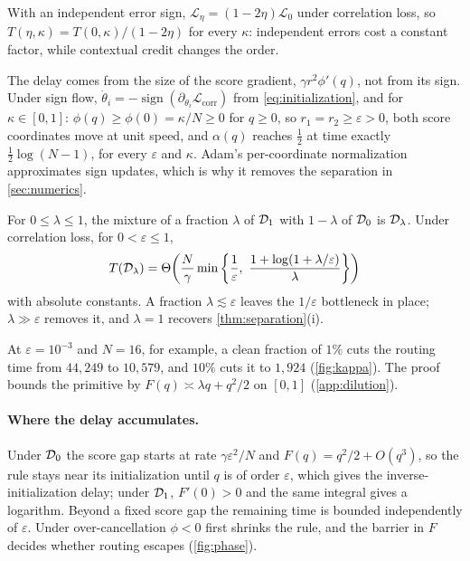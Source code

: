 \begin{remark}
\label{rem:rescaling}
With an independent error sign, $\mathcal L_\eta=(1-2\eta)\mathcal L_0$ under correlation loss, so $T(\eta,\kappa)=T(0,\kappa)/(1-2\eta)$ for every $\kappa$:
independent errors cost a constant factor, while contextual credit changes the order.
\end{remark}

\begin{remark}
\label{rem:sign-flow}
The delay comes from the size of the score gradient, $\gamma r^2\phi'(q)$, not from its sign. Under sign flow, $\dot\theta_i=-\operatorname{sign}(\partial_{\theta_i}\mathcal L_{\mathrm{corr}})$
from \cref{eq:initialization}, and for $\kappa\in[0,1]$: $\phi(q)\ge\phi(0)=\kappa/N\ge0$ for $q\ge0$, so $r_1=r_2\ge\varepsilon>0$, both score coordinates move at unit speed,
and $\alpha(q)$ reaches $\frac12$ at time exactly $\frac12\log(N-1)$, for every $\varepsilon$ and $\kappa$. Adam's per-coordinate normalization approximates sign updates,
which is why it removes the separation in \cref{sec:numerics}.
\end{remark}

\begin{corollary}
\label{cor:dilution}
For $0\le\lambda\le1$, the mixture of a fraction $\lambda$ of $\mathcal D_{1}$ with $1-\lambda$ of $\mathcal D_{0}$ is $\mathcal D_{\lambda}$.
Under correlation loss, for $0<\varepsilon\le1$,
\[
 \Tr(\Dlaw\lambda)=\Theta\!\left(\frac{N}{\gamma}\min\left\{\frac{1}{\varepsilon},\ \frac{1+\log(1+\lambda/\varepsilon)}{\lambda}\right\}\right)
\]
with absolute constants. A fraction $\lambda\lesssim\varepsilon$ leaves the $1/\varepsilon$ bottleneck in place; $\lambda\gg\varepsilon$ removes it,
and $\lambda=1$ recovers \cref{thm:separation}(i).
\end{corollary}
At $\varepsilon=10^{-3}$ and $N=16$, for example, a clean fraction of $1\%$ cuts the routing time from $44{,}249$ to $10{,}579$, and $10\%$ cuts it to $1{,}924$ (\cref{fig:kappa}).
The proof bounds the primitive by $F(q)\asymp\lambda q+q^2/2$ on $[0,1]$ (\cref{app:dilution}).


\paragraph{Where the delay accumulates.}
Under $\mathcal D_{0}$ the score gap starts at rate $\gamma\varepsilon^2/N$ and $F(q)=q^2/2+O(q^3)$, so the rule stays near its initialization until $q$ is of
order $\varepsilon$, which gives the inverse-initialization delay; under $\mathcal D_{1}$, $F'(0)>0$ and the same integral gives a logarithm. Beyond a fixed score gap the
remaining time is bounded independently of $\varepsilon$. Under over-cancellation $\phi<0$ first shrinks the rule, and the barrier in $F$ decides whether routing escapes (\cref{fig:phase}).

